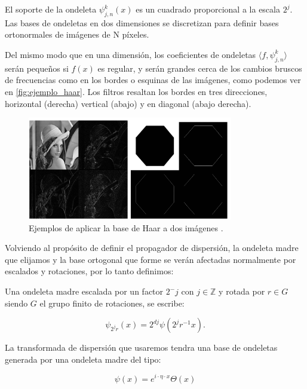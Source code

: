 \medskip

\noindent El soporte de la ondeleta $\psi_{j,n}^k(x)$ es un cuadrado proporcional a la escala $2^j$. Las bases de ondeletas en dos dimensiones se discretizan para definir bases ortonormales de imágenes de N píxeles.


\noindent Del mismo modo que en una dimensión, los coeficientes de ondeletas $\langle f,\psi_{j,n}^k \rangle$ serán pequeños si $f(x)$ es regular, y serán grandes cerca de los cambios bruscos de frecuencias como en los bordes o esquinas de las imágenes, como podemos ver en \autoref{fig:ejemplo_haar}. Los filtros resaltan los bordes en tres direcciones, horizontal (derecha) vertical (abajo) y en diagonal (abajo derecha).

\begin{figure} [!h]
  \centering
  \includegraphics[width=0.8\textwidth]{img/ejemplos_haar_basis.png}
  \caption{Ejemplos de aplicar la base de Haar a dos imágenes \cite{HaarBasis}.}
  \label{fig:ejemplo_haar}
\end{figure}

\medskip 

\noindent Volviendo al propósito de definir el propagador de dispersión, la ondeleta madre que elijamos y la base ortogonal que forme se verán afectadas normalmente por escalados y rotaciones, por lo tanto definimos: 

\begin{definicion}
  Una ondeleta madre escalada por un factor $2^-j$ con $j \in \mathbb{Z}$ y rotada por $r \in G$ siendo $G$ el grupo finito de rotaciones, se escribe: 

  $$\psi_{2^j r}(x)=2^{dj} \psi(2^j r^{-1} x).$$
\end{definicion}


\medskip

\noindent La transformada de dispersión que usaremos tendra una base de ondeletas generada por una ondeleta madre del tipo:

$$\psi(x)=e^{i\cdot \eta \cdot  x} \Theta(x)$$

